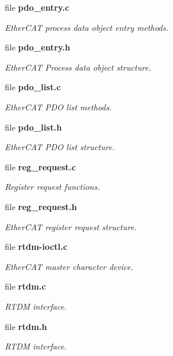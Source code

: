 \begin{DoxyCompactItemize}
file {\bf pdo\-\_\-entry.\-c}
\begin{DoxyCompactList}\small\item\em Ether\-C\-A\-T process data object entry methods. \end{DoxyCompactList}\item 
file {\bf pdo\-\_\-entry.\-h}
\begin{DoxyCompactList}\small\item\em Ether\-C\-A\-T Process data object structure. \end{DoxyCompactList}\item 
file {\bf pdo\-\_\-list.\-c}
\begin{DoxyCompactList}\small\item\em Ether\-C\-A\-T P\-D\-O list methods. \end{DoxyCompactList}\item 
file {\bf pdo\-\_\-list.\-h}
\begin{DoxyCompactList}\small\item\em Ether\-C\-A\-T P\-D\-O list structure. \end{DoxyCompactList}\item 
file {\bf reg\-\_\-request.\-c}
\begin{DoxyCompactList}\small\item\em Register request functions. \end{DoxyCompactList}\item 
file {\bf reg\-\_\-request.\-h}
\begin{DoxyCompactList}\small\item\em Ether\-C\-A\-T register request structure. \end{DoxyCompactList}\item 
file {\bf rtdm-\/ioctl.\-c}
\begin{DoxyCompactList}\small\item\em Ether\-C\-A\-T master character device. \end{DoxyCompactList}\item 
file {\bf rtdm.\-c}
\begin{DoxyCompactList}\small\item\em R\-T\-D\-M interface. \end{DoxyCompactList}\item 
file {\bf rtdm.\-h}
\begin{DoxyCompactList}\small\item\em R\-T\-D\-M interface. \end{DoxyCompactList}\item 

\end{DoxyCompactItemize}
